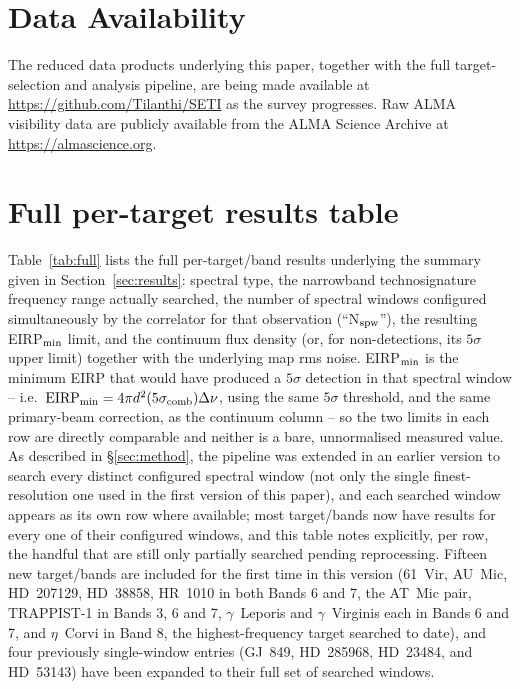 \documentclass{openjournal}
\begin{document}
\section*{Data Availability}
The reduced data products underlying this paper, together with the full
target-selection and analysis pipeline, are being made available at
\url{https://github.com/Tilanthi/SETI} as the survey progresses. Raw ALMA
visibility data are publicly available from the ALMA Science Archive at
\url{https://almascience.org}.


\appendix
\section{Full per-target results table}
\label{app:table}

Table~\ref{tab:full} lists the full per-target/band results underlying the
summary given in Section~\ref{sec:results}: spectral type, the narrowband
technosignature frequency range actually searched, the number of spectral
windows configured simultaneously by the correlator for that observation
(``N$_{\rm spw}$''), the resulting EIRP$_{\rm min}$ limit, and the
continuum flux density (or, for non-detections, its $5\sigma$ upper
limit) together with the underlying map rms noise. EIRP$_{\rm min}$ is
the minimum EIRP that would have produced a $5\sigma$ detection in that
spectral window -- i.e.\ $\mathrm{EIRP_{min}} = 4\pi d^{2}(5\sigma_{\rm
comb})\Delta\nu$, using the same $5\sigma$ threshold, and the same
primary-beam correction, as the continuum column -- so the two limits in
each row are directly comparable and neither is a bare, unnormalised
measured value. As described in \S\ref{sec:method}, the pipeline was
extended in an earlier version to search every distinct configured
spectral window (not only the single finest-resolution one used in the
first version of this paper), and each searched window appears as its
own row where available; most target/bands now have results for every
one of their configured windows, and this table notes explicitly, per
row, the handful that are still only partially searched pending
reprocessing. Fifteen new target/bands are included for the first time
in this version (61~Vir, AU~Mic, HD~207129, HD~38858, HR~1010 in both
Bands 6 and 7, the AT~Mic pair, TRAPPIST-1 in Bands 3, 6 and 7,
$\gamma$~Leporis and $\gamma$~Virginis each in Bands 6 and 7, and
$\eta$~Corvi in Band 8, the highest-frequency target searched to date),
and four previously single-window entries (GJ~849, HD~285968, HD~23484,
and HD~53143) have been expanded to their full set of searched windows.
\end{document}
